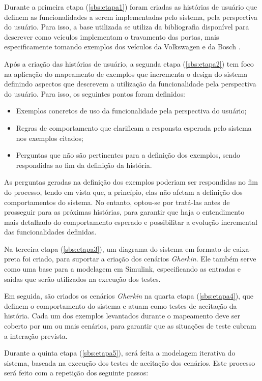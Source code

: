 Durante a primeira etapa (\ref{sbs:etapa1}) foram criadas as histórias de usuário que definem as funcionalidades a serem implementadas pelo sistema, 
pela perspectiva do usuário. Para isso, a base utilizada se utiliza da bibliografia disponível para descrever como veículos implementam o travamento das portas, 
mais especificamente tomando exemplos dos veículos da Volkswagen \cite{vwLocking} e da Bosch \cite{bosch2022handbook,reif2017locking}.

Após a criação das histórias de usuário, a segunda etapa (\ref{sbs:etapa2}) tem foco na aplicação do mapeamento de exemplos que incrementa o design do sistema definindo aspectos 
que descrevem a utilização da funcionalidade pela perspectiva do usuário. Para isso, os seguintes pontos foram definidos:

\begin{itemize}
    \item Exemplos concretos de uso da funcionalidade pela perspectiva do usuário;
    \item Regras de comportamento que clarificam a responsta esperada pelo sistema nos exemplos citados;
    \item Perguntas que não são pertinentes para a definição dos exemplos, sendo respondidas ao fim da definição da história.
\end{itemize}

As perguntas geradas na definição dos exemplos poderiam ser respondidas no fim do processo, tendo em vista que, a princípio, elas não afetam a definição 
dos comportamentos do sistema. No entanto, optou-se por tratá-las antes de prosseguir para as próximas histórias, para garantir que haja o entendimento 
mais detalhado do comportamento esperado e possibilitar a evolução incremental das funcionalidades definidas.

Na terceira etapa (\ref{sbs:etapa3}), um diagrama do sistema em formato de caixa-preta foi criado, para suportar a criação dos cenários \textit{Gherkin}. Ele 
também serve como uma base para a modelagem em Simulink, especificando as entradas e saídas que serão utilizados na execução dos testes.

Em seguida, são criados os cenários \textit{Gherkin} na quarta etapa (\ref{sbs:etapa4}), que definem o comportamento do sistema e atuam como testes de aceitação 
da história. Cada um dos exemplos levantados durante o mapeamento deve ser coberto por um ou mais cenários, para garantir que as situações de teste cubram 
a interação prevista.

Durante a quinta etapa (\ref{sbs:etapa5}), será feita a modelagem iterativa do sistema, baseada na execução dos testes de aceitação dos cenários. Este processo será 
feito com a repetição dos seguinte passos:

